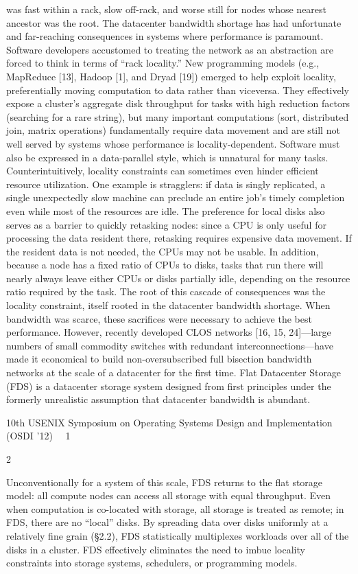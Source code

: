 was fast within a rack, slow off-rack, and worse still for
nodes whose nearest ancestor was the root.
The datacenter bandwidth shortage has had unfortunate and far-reaching consequences in systems where
performance is paramount. Software developers accustomed to treating the network as an abstraction are
forced to think in terms of “rack locality.” New programming models (e.g., MapReduce [13], Hadoop [1],
and Dryad [19]) emerged to help exploit locality, preferentially moving computation to data rather than viceversa. They effectively expose a cluster’s aggregate disk
throughput for tasks with high reduction factors (searching for a rare string), but many important computations
(sort, distributed join, matrix operations) fundamentally
require data movement and are still not well served by
systems whose performance is locality-dependent. Software must also be expressed in a data-parallel style,
which is unnatural for many tasks.
Counterintuitively, locality constraints can sometimes
even hinder efficient resource utilization. One example is
stragglers: if data is singly replicated, a single unexpectedly slow machine can preclude an entire job’s timely
completion even while most of the resources are idle.
The preference for local disks also serves as a barrier
to quickly retasking nodes: since a CPU is only useful for processing the data resident there, retasking requires expensive data movement. If the resident data is
not needed, the CPUs may not be usable. In addition, because a node has a fixed ratio of CPUs to disks, tasks that
run there will nearly always leave either CPUs or disks
partially idle, depending on the resource ratio required
by the task.
The root of this cascade of consequences was the locality constraint, itself rooted in the datacenter bandwidth shortage. When bandwidth was scarce, these sacrifices were necessary to achieve the best performance.
However, recently developed CLOS networks [16, 15,
24]—large numbers of small commodity switches with
redundant interconnections—have made it economical to
build non-oversubscribed full bisection bandwidth networks at the scale of a datacenter for the first time. Flat
Datacenter Storage (FDS) is a datacenter storage system
designed from first principles under the formerly unrealistic assumption that datacenter bandwidth is abundant.

10th USENIX Symposium on Operating Systems Design and Implementation (OSDI ’12)  1


2

Unconventionally for a system of this scale, FDS returns to the flat storage model: all compute nodes can access all storage with equal throughput. Even when computation is co-located with storage, all storage is treated
as remote; in FDS, there are no “local” disks. By spreading data over disks uniformly at a relatively fine grain
(§2.2), FDS statistically multiplexes workloads over all
of the disks in a cluster. FDS effectively eliminates the
need to imbue locality constraints into storage systems,
schedulers, or programming models.

